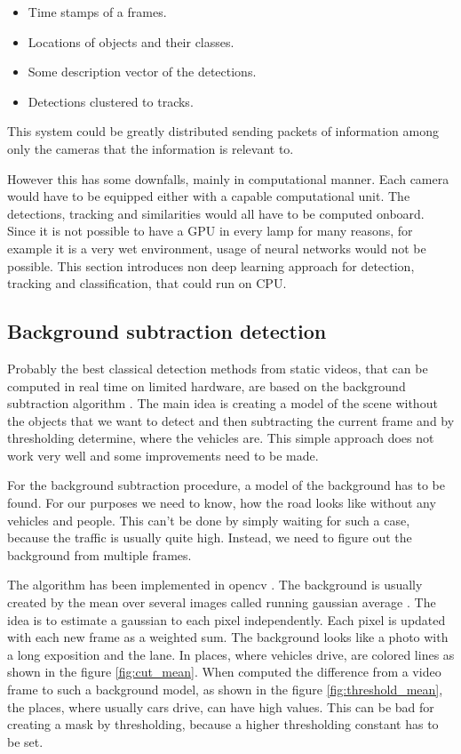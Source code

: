 \documentclass[a4paper,12pt,titlepage, twoside]{article}
\numberwithin{figure}{section}
\begin{document}
\begin{itemize}
\item Time stamps of a frames.
\item Locations of objects and their classes.
\item Some description vector of the detections.
\item Detections clustered to tracks.
\end{itemize}

This system could be greatly distributed sending packets of information among only the cameras that the information is relevant to.

However this has some downfalls, mainly in computational manner. Each camera would have to be equipped either with a capable computational unit. The detections, tracking and similarities would all have to be computed onboard. Since it is not possible to have a GPU in every lamp for many reasons, for example it is a very wet environment, usage of neural networks would not be possible. This section introduces non deep learning approach for detection, tracking and classification, that could run on CPU.



\subsection{Background subtraction detection}
\label{sec:bgs}

Probably the best classical detection methods from static videos, that can be computed in real time on limited hardware, are based on the background subtraction algorithm \cite{piccardi2004background}. The main idea is creating a model of the scene without the objects that we want to detect and then subtracting the current frame and by thresholding determine, where the vehicles are. This simple approach does not work very well and some improvements need to be made. 

For the background subtraction procedure, a model of the background has to be found. For our purposes we need to know, how the road looks like without any vehicles and people. This can't be done by simply waiting for such a case, because the traffic is usually quite high. Instead, we need to figure out the background from multiple frames. 


The algorithm has been implemented in opencv \cite{opencv}. The background is usually created by the mean over several images called running gaussian average \cite{wren1997pfinder}. The idea is to estimate a gaussian to each pixel independently. Each pixel is updated with each new frame as a weighted sum. The background looks like a photo with a long exposition and the lane. In places, where vehicles drive, are colored lines as shown in the figure \ref{fig:cut_mean}. When computed the difference from a video frame to such a background model, as shown in the figure \ref{fig:threshold_mean}, the places, where usually cars drive, can have high values. This can be bad for creating a mask by thresholding, because a higher thresholding constant has to be set.
\end{document}
